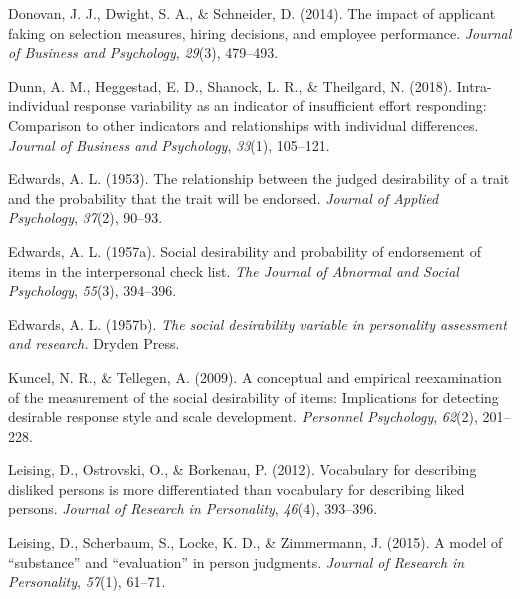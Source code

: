 \documentclass[
  ,man]{apa6}
\newlength{\cslhangindent}
\newlength{\cslentryspacingunit} %
\newenvironment{CSLReferences}[2] %
 {%
  \setlength{\parindent}{0pt}
  \ifodd #1
  \let\oldpar\par
  \def\par{\hangindent=\cslhangindent\oldpar}
  \fi
  \setlength{\parskip}{#2\cslentryspacingunit}
 }%
 {}
\begin{document}
\begin{CSLReferences}{1}{0}
\leavevmode{}%
Donovan, J. J., Dwight, S. A., \& Schneider, D. (2014). The impact of applicant faking on selection measures, hiring decisions, and employee performance. \emph{Journal of Business and Psychology}, \emph{29}(3), 479--493.

\leavevmode{}%
Dunn, A. M., Heggestad, E. D., Shanock, L. R., \& Theilgard, N. (2018). Intra-individual response variability as an indicator of insufficient effort responding: Comparison to other indicators and relationships with individual differences. \emph{Journal of Business and Psychology}, \emph{33}(1), 105--121.

\leavevmode{}%
Edwards, A. L. (1953). The relationship between the judged desirability of a trait and the probability that the trait will be endorsed. \emph{Journal of Applied Psychology}, \emph{37}(2), 90--93.

\leavevmode{}%
Edwards, A. L. (1957a). Social desirability and probability of endorsement of items in the interpersonal check list. \emph{The Journal of Abnormal and Social Psychology}, \emph{55}(3), 394--396.

\leavevmode{}%
Edwards, A. L. (1957b). \emph{The social desirability variable in personality assessment and research.} Dryden Press.

\leavevmode{}%
Kuncel, N. R., \& Tellegen, A. (2009). A conceptual and empirical reexamination of the measurement of the social desirability of items: Implications for detecting desirable response style and scale development. \emph{Personnel Psychology}, \emph{62}(2), 201--228.

\leavevmode{}%
Leising, D., Ostrovski, O., \& Borkenau, P. (2012). Vocabulary for describing disliked persons is more differentiated than vocabulary for describing liked persons. \emph{Journal of Research in Personality}, \emph{46}(4), 393--396.

\leavevmode{}%
Leising, D., Scherbaum, S., Locke, K. D., \& Zimmermann, J. (2015). A model of {``substance''} and {``evaluation''} in person judgments. \emph{Journal of Research in Personality}, \emph{57}(1), 61--71.


\end{CSLReferences}
\end{document}
